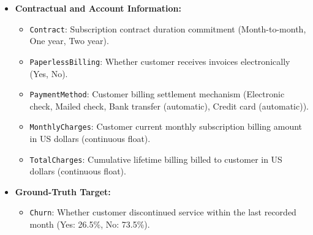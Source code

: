 \documentclass[12pt,a4paper]{report}
\newcommand{\datasetChurnProportion}{26.5\%}
\newcommand{\datasetRetainedProportion}{73.5\%}
\begin{document}
\begin{itemize}
\begin{itemize}
        \item \texttt{StreamingTV}: Streaming television digital television service (Yes, No, No internet service).
        \item \texttt{StreamingMovies}: Streaming digital cinema and video-on-demand service (Yes, No, No internet service).
    \end{itemize}
    \item \textbf{Contractual and Account Information:}
    \begin{itemize}
        \item \texttt{Contract}: Subscription contract duration commitment (Month-to-month, One year, Two year).
        \item \texttt{PaperlessBilling}: Whether customer receives invoices electronically (Yes, No).
        \item \texttt{PaymentMethod}: Customer billing settlement mechanism (Electronic check, Mailed check, Bank transfer (automatic), Credit card (automatic)).
        \item \texttt{MonthlyCharges}: Customer current monthly subscription billing amount in US dollars (continuous float).
        \item \texttt{TotalCharges}: Cumulative lifetime billing billed to customer in US dollars (continuous float).
    \end{itemize}
    \item \textbf{Ground-Truth Target:}
    \begin{itemize}
        \item \texttt{Churn}: Whether customer discontinued service within the last recorded month (Yes: \datasetChurnProportion{}, No: \datasetRetainedProportion{}).
    \end{itemize}
\end{itemize}
\end{document}
